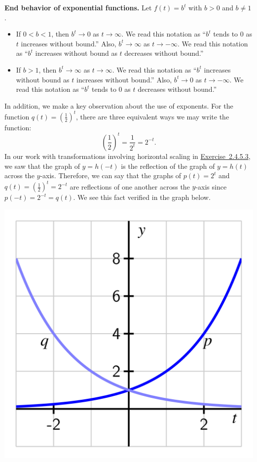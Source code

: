 \documentclass[nooutcomes]{ximera}
\begin{document}
\begin{callout}
\textbf{\Large End behavior of exponential functions.}
Let $f(t) = b^t$ with $b > 0$ and $b \ne 1$.
\begin{itemize}
\item If $0 < b < 1$, then $b^t \to 0$ as $t \to \infty$.  We read this notation as ``$b^t$ tends to $0$ as $t$ increases without bound.'' Also, $b^t \to \infty$ as $t \to -\infty$. We read this notation as ``$b^t$ increases without bound as $t$ decreases without bound.''
\item If $b > 1$, then $b^t \to \infty$ as $t \to \infty$.  We read this notation as ``$b^t$ increases without bound as $t$ increases without bound.'' Also, $b^t \to 0$ as $t \to -\infty$. We read this notation as ``$b^t$ tends to $0$ as $t$ decreases without bound.''
\end{itemize}
\end{callout}

In addition, we make a key observation about the use of exponents.  For the function $q(t) = \left(\frac{1}{2}\right)^t$, there are three equivalent ways we may write the function:%
\begin{equation*}
\left( \frac{1}{2} \right)^t = \frac{1}{2^t} = 2^{-t}\text{.}
\end{equation*}
In our work with transformations involving horizontal scaling in \hyperlink{ez-circular-sinusoidal-horiz-reflection}{Exercise~2.4.5.3}, we saw that the graph of $y = h(-t)$ is the reflection of the graph of $y = h(t)$ across the $y$-axis.  Therefore, we can say that the graphs of $p(t) = 2^t$ and $q(t) = \left(\frac{1}{2}\right)^t = 2^{-t}$ are reflections of one another across the $y$-axis since $p(-t) = 2^{-t} = q(t)$.  We see this fact verified in the graph below.

\begin{image}
\includegraphics{modeling-exp-reflection.jpg}
\end{image}
\end{document}
